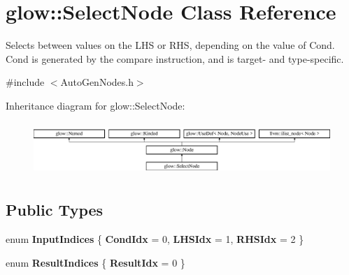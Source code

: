 \hypertarget{classglow_1_1_select_node}{}\section{glow\+:\+:Select\+Node Class Reference}
\label{classglow_1_1_select_node}


Selects between values on the L\+HS or R\+HS, depending on the value of Cond. Cond is generated by the compare instruction, and is target-\/ and type-\/specific.  




{\ttfamily \#include $<$Auto\+Gen\+Nodes.\+h$>$}

Inheritance diagram for glow\+:\+:Select\+Node\+:\begin{figure}[H]
\begin{center}
\leavevmode
\includegraphics[height=2.028986cm]{classglow_1_1_select_node}
\end{center}
\end{figure}
\subsection*{Public Types}
\begin{DoxyCompactItemize}
\item 
\mbox{\label{classglow_1_1_select_node_a7d0aca505c3d373730a5050586acf8ab}} 
enum {\bfseries Input\+Indices} \{ {\bfseries Cond\+Idx} = 0, 
{\bfseries L\+H\+S\+Idx} = 1, 
{\bfseries R\+H\+S\+Idx} = 2
 \}
\item 
\mbox{\label{classglow_1_1_select_node_ab5d983895901b6775cd48c86dae420ef}} 
enum {\bfseries Result\+Indices} \{ {\bfseries Result\+Idx} = 0
 \}
\end{DoxyCompactItemize}
